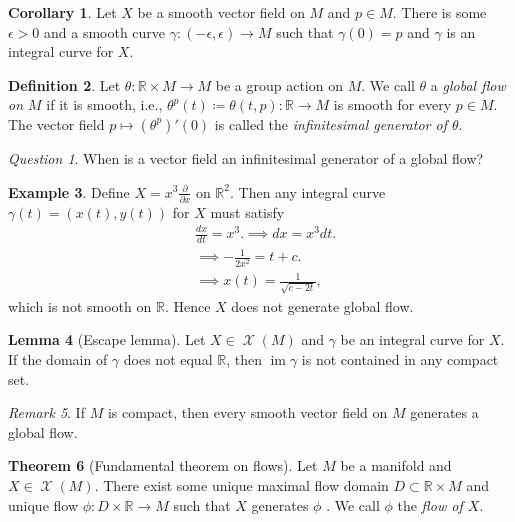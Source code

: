 \documentclass[10pt,letterpaper,cm]{nupset}
\theoremstyle{definition}
\newtheorem{definition}{Definition}[subsection]
\newtheorem{exmp}[definition]{Example}
\theoremstyle{theorem}
\newtheorem{theorem}[definition]{Theorem}
\newtheorem{lemma}[definition]{Lemma}
\newtheorem{corollary}[definition]{Corollary}
\theoremstyle{remark}
\newtheorem{remark}[definition]{Remark}
\newtheorem*{question}{Question}
\newcommand{\R}{\mathbb R}
\newcommand{\1}{\mathbf{1}}
\newcommand{\0}{\vec 0}
\DeclareMathOperator{\im}{im}
\DeclareMathOperator{\vf}{\mathscr{X}}
\begin{document}
\begin{corollary}
Let $X$ be a smooth vector field on $M$ and $p\in M$. There is some $\epsilon >0$ and a smooth curve $\gamma : (-\epsilon , \epsilon) \to M$ such that $\gamma(0)= p$ and $\gamma$ is an integral curve for $X$.
\end{corollary}

\begin{definition}
Let $\theta : \R \times M \to M$ be a group action on $M$. We call $\theta$ a \textit{global flow on $M$} if it is smooth, i.e., $\theta^p(t)\coloneqq  \theta(t, p) : \R \to M$ is smooth for every $p\in M$.
The vector field $p\mapsto  (\theta^p)'(0)$  is called the \textit{infinitesimal generator of $\theta$}.
\end{definition}

\begin{question}
When is a vector field an infinitesimal generator of  a global flow?
\end{question}

\begin{exmp}
Define $X = x^3\frac{\partial}{\partial{x}}$ on $\R^2$. Then any integral curve $\gamma (t) = (x(t), y(t))$ for $X$ must satisfy
\begin{align*}
& \frac{dx}{dt} = x^3.
 \implies  dx = x^3dt.
\\ & \implies -\frac{1}{2x^2} = t+c.
\\ & \implies x(t) = \frac{1}{\sqrt{c-2t}},
\end{align*}
which is not smooth on $\R$. Hence $X$ does not generate global flow.
\end{exmp}

\begin{lemma}[Escape lemma]
Let $X \in \vf(M)$ and $\gamma$ be an integral curve for $X$. If the domain of $\gamma$ does not equal $\R$, then $\im \gamma$ is not contained in any compact set.
\end{lemma}

\begin{remark}
If $M$ is compact, then every smooth vector field on $M$ generates a global flow.
\end{remark}

\begin{theorem}[Fundamental theorem on flows]
Let $M$ be a manifold and $X\in \vf(M)$. There exist some unique maximal flow domain $D\subset \R \times M$ and unique flow $\phi: D \times \R \to M$ such that $X$ generates $\phi$ . We call $\phi$ the \textit{flow of $X$}.
\end{theorem}
\end{document}

